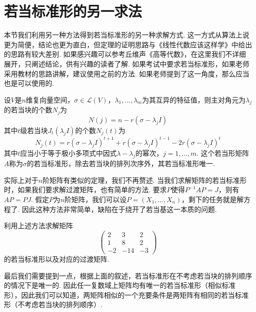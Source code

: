\begin{solution}

\end{solution}

\section{若当标准形的另一求法}\label{sect:22:若当标准形的另一求法}

本节我们利用另一种方法得到若当标准形的另一种求解方式. 这一方式从算法上说更为简便，结论也更为直白，但定理的证明思路与《线性代数应该这样学》中给出的思路有较大差别. 如果感兴趣可以参考丘维声《高等代数》，在这里我们不详细展开，只阐述结论，供有兴趣的读者了解. 如果考试中要求若当标准形，如果老师采用教材的思路讲解，建议使用之前的方法. 如果老师提到了这一角度，那么应当也是可以使用的.
\begin{theorem}
    设$V$是$n$维复向量空间，$\sigma\in \mathcal{L}(V)$，$\lambda_1,\ldots,\lambda_m$为其互异的特征值，则主对角元为$\lambda_j$的若当块的个数$N_j$为
    \[N(j)=n-r(\sigma-\lambda_jI)\]
    其中$t$级若当块$J_t(\lambda_jI)$的个数$N_j(t)$为
    \[N_j(t)=r(\sigma-\lambda_jI)^{t+1}+r(\sigma-\lambda_jI)^{t-1}-2r(\sigma-\lambda_jI)^t\]
    其中$t$应当小于等于极小多项式中因式$\lambda-\lambda_j$的幂次，$j=1,\ldots,m$. 这个若当形矩阵$A$称为$\sigma$的若当标准形，除去若当块的排列次序外，其若当标准形唯一.
\end{theorem}
实际上对于$n$阶矩阵有类似的定理，我们不再赘述. 当我们求解矩阵的若当标准形时，如果我们要求解过渡矩阵，也有简单的方法. 要求$P$使得$P^{-1}AP=J$，则有$AP=PJ$. 假定$P$为$n$阶矩阵，我们可以设$P=(X_1,\ldots,X_n)$，剩下的任务就是解方程了. 因此这种方法非常简单，缺陷在于绕开了若当基这一本质的问题.
\begin{example}
    利用上述方法求解矩阵\[\begin{pmatrix}
            2 & 3 & 2 \\ 1 & 8 & 2 \\ -2 & -14 & -3
        \end{pmatrix}\]的若当标准形以及对应的过渡矩阵.
\end{example}

\begin{solution}

\end{solution}

最后我们需要提到一点，根据上面的叙述，若当标准形在不考虑若当块的排列顺序的情况下是唯一的. 因此任一复数域上矩阵均有唯一的若当标准形（相似标准形），因此我们可以知道，两矩阵相似的一个充要条件是两矩阵有相同的若当标准形（不考虑若当块的排列顺序）.

